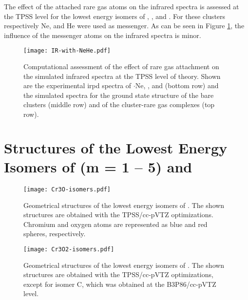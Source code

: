 \begin{refsection}
The effect of the attached rare gas atoms on the infrared spectra is assessed at the TPSS level for the lowest energy isomers of , , and . For these clusters respectively Ne,  and He were used as messenger. As can be seen in Figure \ref{a7fig:with-NeHe}, the influence of the messenger atoms on the infrared spectra is minor.


\begin{figure}[htb!]
	\centering
	\texttt{[image: IR-with-NeHe.pdf]}
	\caption{Computational assessment of the effect of rare gas attachment on the simulated infrared spectra at the TPSS level of theory. Shown are the experimental \acrshort{irpd}  spectra of $\boldsymbol{\cdot}$Ne, , and  (bottom row) and the simulated spectra for the ground state structure of the bare clusters (middle row) and of the cluster-rare gas complexes (top row).}
	\label{a7fig:with-NeHe}
\end{figure}



\newpage
\section[Geometric Structures of \ch{C\lowercase{r}3O_{\lowercase{m}}^+} (\lowercase{m} = 1 -- 5) and \ch{C\lowercase{r}4O4+}]{Structures of the Lowest Energy Isomers of  (\lowercase{m} = 1 -- 5) and }

\begin{figure}[]
	\centering
	\texttt{[image: Cr3O-isomers.pdf]}
	\caption{Geometrical structures of the lowest energy isomers of . The shown structures are obtained with the TPSS/cc-pVTZ optimizations. Chromium and oxygen atoms are represented as blue and red spheres, respectively.}
	\label{a7fig:Cr3O-isomers}
\end{figure}

\begin{figure}[]
	\centering
	\texttt{[image: Cr3O2-isomers.pdf]}
	\caption{Geometrical structures of the lowest energy isomers of . The shown structures are obtained with the TPSS/cc-pVTZ optimizations, except for  isomer C, which was obtained at the B3P86/cc-pVTZ level. }
	\label{a7fig:Cr3O2-isomers}
\end{figure}


\end{refsection}
